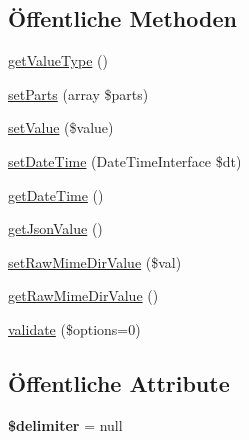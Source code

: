 \subsection*{Öffentliche Methoden}
\begin{DoxyCompactItemize}
\item 
\mbox{\hyperlink{class_sabre_1_1_v_object_1_1_property_1_1_v_card_1_1_date_and_or_time_a83f65061bc4052861ce952148df4ce53}{get\+Value\+Type}} ()
\item 
\mbox{\hyperlink{class_sabre_1_1_v_object_1_1_property_1_1_v_card_1_1_date_and_or_time_a031cce76afab73f9a005ab1893344ac5}{set\+Parts}} (array \$parts)
\item 
\mbox{\hyperlink{class_sabre_1_1_v_object_1_1_property_1_1_v_card_1_1_date_and_or_time_af8121bf2ee807a2098530f6b70173813}{set\+Value}} (\$value)
\item 
\mbox{\hyperlink{class_sabre_1_1_v_object_1_1_property_1_1_v_card_1_1_date_and_or_time_a58d4f40d565354e5262a27a59e2f7033}{set\+Date\+Time}} (Date\+Time\+Interface \$dt)
\item 
\mbox{\hyperlink{class_sabre_1_1_v_object_1_1_property_1_1_v_card_1_1_date_and_or_time_ab114fe88283fdf00e3a140fb55b87ef6}{get\+Date\+Time}} ()
\item 
\mbox{\hyperlink{class_sabre_1_1_v_object_1_1_property_1_1_v_card_1_1_date_and_or_time_a2483cedf4855c2e116e31086af84a7d0}{get\+Json\+Value}} ()
\item 
\mbox{\hyperlink{class_sabre_1_1_v_object_1_1_property_1_1_v_card_1_1_date_and_or_time_ae18affff02e7e17a15ab4fc157bdbc50}{set\+Raw\+Mime\+Dir\+Value}} (\$val)
\item 
\mbox{\hyperlink{class_sabre_1_1_v_object_1_1_property_1_1_v_card_1_1_date_and_or_time_a84c8474fc979b490c40828cf6f0c207e}{get\+Raw\+Mime\+Dir\+Value}} ()
\item 
\mbox{\hyperlink{class_sabre_1_1_v_object_1_1_property_1_1_v_card_1_1_date_and_or_time_aa1f8a9309be805133f90e3051b1956af}{validate}} (\$options=0)
\end{DoxyCompactItemize}
\subsection*{Öffentliche Attribute}
\begin{DoxyCompactItemize}
\item 
\mbox{\label{class_sabre_1_1_v_object_1_1_property_1_1_v_card_1_1_date_and_or_time_a6d72a2523ddfeaf0ff8288a8974211f3}} 
{\bfseries \$delimiter} = null
\end{DoxyCompactItemize}
